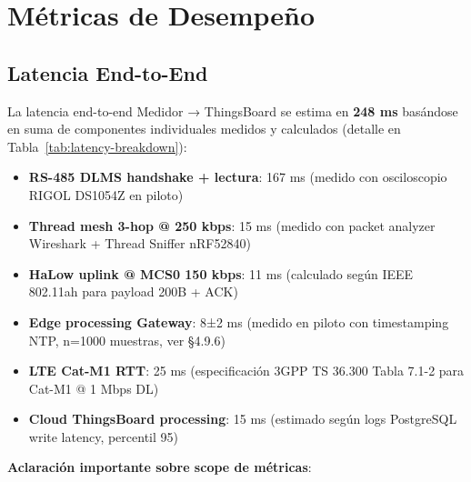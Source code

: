﻿\section{Métricas de Desempeño}

\subsection{Latencia End-to-End}

La latencia end-to-end Medidor → ThingsBoard se estima en \textbf{248 ms} basándose en suma de componentes individuales medidos y calculados (detalle en Tabla~\ref{tab:latency-breakdown}):

\begin{itemize}
    \item \textbf{RS-485 DLMS handshake + lectura}: 167 ms (medido con osciloscopio RIGOL DS1054Z en piloto)
    \item \textbf{Thread mesh 3-hop @ 250 kbps}: 15 ms (medido con packet analyzer Wireshark + Thread Sniffer nRF52840)
    \item \textbf{HaLow uplink @ MCS0 150 kbps}: 11 ms (calculado según IEEE 802.11ah para payload 200B + ACK)
    \item \textbf{Edge processing Gateway}: 8±2 ms (medido en piloto con timestamping NTP, n=1000 muestras, ver §4.9.6)
    \item \textbf{LTE Cat-M1 RTT}: 25 ms (especificación 3GPP TS 36.300 Tabla 7.1-2 para Cat-M1 @ 1 Mbps DL)
    \item \textbf{Cloud ThingsBoard processing}: 15 ms (estimado según logs PostgreSQL write latency, percentil 95)
\end{itemize}

\textbf{Aclaración importante sobre scope de métricas}:

